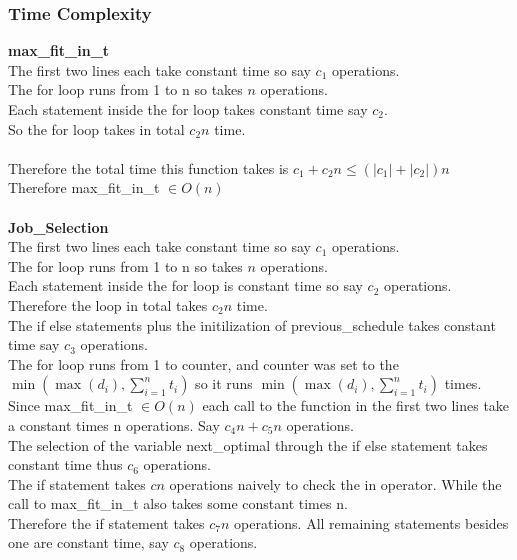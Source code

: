 \documentclass{article}
\begin{document}
      \subsubsection{Time Complexity}
        \textbf{max\_fit\_in\_t}\\
        The first two lines each take constant time so say $c_{1}$ operations.\\
        The for loop runs from 1 to n so takes $n$ operations.\\
        Each statement inside the for loop takes constant time say $c_{2}$.\\
        So the for loop takes in total $c_{2}n$ time.\\
        \\
        Therefore the total time this function takes is $c_{1} + c_{2}n \leq (|c_{1}| + |c_{2}|)n$\\
        Therefore max\_fit\_in\_t $\in O(n)$\\
        \\
        \textbf{Job\_Selection}\\
        The first two lines each take constant time so say $c_{1}$ operations.\\
        The for loop runs from 1 to n so takes $n$ operations.\\
        Each statement inside the for loop is constant time so say $c_{2}$ operations.\\
        Therefore the loop in total takes $c_{2}n$ time.\\
        The if else statements plus the initilization of previous\_schedule takes constant time say $c_{3}$ operations.\\
        The for loop runs from 1 to counter, and counter was set to the $\min(\max(d_{i}), \sum_{i = 1}^{n} t_{i})$ so it runs $\min(\max(d_{i}), \sum_{i = 1}^{n} t_{i})$ times.\\
        Since max\_fit\_in\_t $\in O(n)$ each call to the function in the first two lines take a constant times n operations. 
        Say $c_{4}n + c_{5}n$ operations. \\
        The selection of the variable next\_optimal through the if else statement takes constant time thus $c_{6}$ operations.\\
        The if statement takes $cn$ operations naively to check the in operator. While the call to max\_fit\_in\_t also takes some constant times n.\\
        Therefore the if statement takes $c_{7}n$ operations.
        All remaining statements besides one are constant time, say $c_{8}$ operations.\\
\end{document}
